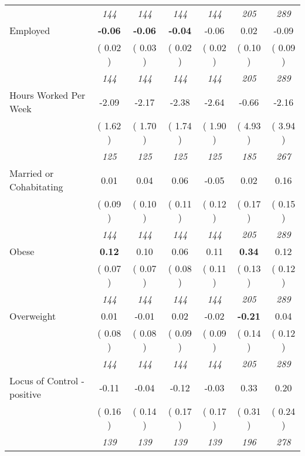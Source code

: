 \begin{tabular}{l c c c c c c}
& \textit{ 144 } & \textit{ 144 } & \textit{ 144 } & \textit{ 144 } & \textit{ 205 } & \textit{ 289 } \\
Employed & \textbf{     -0.06 } & \textbf{     -0.06 } & \textbf{     -0.04 } &     -0.06 &      0.02 &     -0.09 \\
& (     0.02 ) & (     0.03 ) & (     0.02 ) & (     0.02 ) & (     0.10 ) & (     0.09 ) \\
& \textit{ 144 } & \textit{ 144 } & \textit{ 144 } & \textit{ 144 } & \textit{ 205 } & \textit{ 289 } \\
Hours Worked Per Week &     -2.09 &     -2.17 &     -2.38 &     -2.64 &     -0.66 &     -2.16 \\
& (     1.62 ) & (     1.70 ) & (     1.74 ) & (     1.90 ) & (     4.93 ) & (     3.94 ) \\
& \textit{ 125 } & \textit{ 125 } & \textit{ 125 } & \textit{ 125 } & \textit{ 185 } & \textit{ 267 } \\
Married or Cohabitating &      0.01 &      0.04 &      0.06 &     -0.05 &      0.02 &      0.16 \\
& (     0.09 ) & (     0.10 ) & (     0.11 ) & (     0.12 ) & (     0.17 ) & (     0.15 ) \\
& \textit{ 144 } & \textit{ 144 } & \textit{ 144 } & \textit{ 144 } & \textit{ 205 } & \textit{ 289 } \\
Obese & \textbf{      0.12 } &      0.10 &      0.06 &      0.11 & \textbf{      0.34 } &      0.12 \\
& (     0.07 ) & (     0.07 ) & (     0.08 ) & (     0.11 ) & (     0.13 ) & (     0.12 ) \\
& \textit{ 144 } & \textit{ 144 } & \textit{ 144 } & \textit{ 144 } & \textit{ 205 } & \textit{ 289 } \\
Overweight &      0.01 &     -0.01 &      0.02 &     -0.02 & \textbf{     -0.21 } &      0.04 \\
& (     0.08 ) & (     0.08 ) & (     0.09 ) & (     0.09 ) & (     0.14 ) & (     0.12 ) \\
& \textit{ 144 } & \textit{ 144 } & \textit{ 144 } & \textit{ 144 } & \textit{ 205 } & \textit{ 289 } \\
Locus of Control - positive &     -0.11 &     -0.04 &     -0.12 &     -0.03 &      0.33 &      0.20 \\
& (     0.16 ) & (     0.14 ) & (     0.17 ) & (     0.17 ) & (     0.31 ) & (     0.24 ) \\
& \textit{ 139 } & \textit{ 139 } & \textit{ 139 } & \textit{ 139 } & \textit{ 196 } & \textit{ 278 } \\

\end{tabular}

